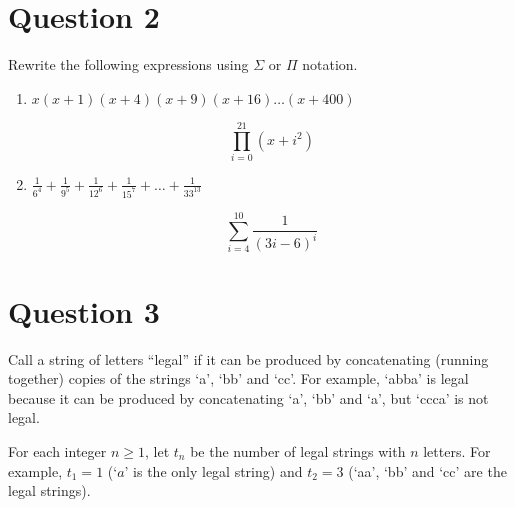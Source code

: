 \documentclass[11pt]{article}
\begin{document}
\section*{Question 2}
Rewrite the following expressions using $\Sigma$ or $\Pi$ notation.

\begin{enumerate}[label= (\alph*)]
  \item $x(x+1)(x+4)(x+9)(x+16) \dots (x+400)$

    \[ \prod_{i=0}^{21} (x + i^2) \]

  \item $\frac{1}{6^4} + \frac{1}{9^5} + \frac{1}{12^6} + \frac{1}{15^7} + \dots
    + \frac{1}{33^{13}}$

    \[ \sum_{i=4}^{10} \frac{1}{{(3i - 6)}^{i}} \]

\end{enumerate}

\section*{Question 3}
Call a string of letters ``legal'' if it can be produced by concatenating
(running together) copies of the strings `a', `bb' and `cc'. For example,
`abba' is legal because it can be produced by concatenating `a', `bb' and `a',
but `ccca' is not legal.

For each integer $n \geq 1$, let $t_n$ be the number of legal strings with $n$
letters. For example, $t_1 = 1$ (`$a$' is the only legal string) and $t_2 = 3$
(`aa', `bb' and `cc' are the legal strings).
\end{document}
